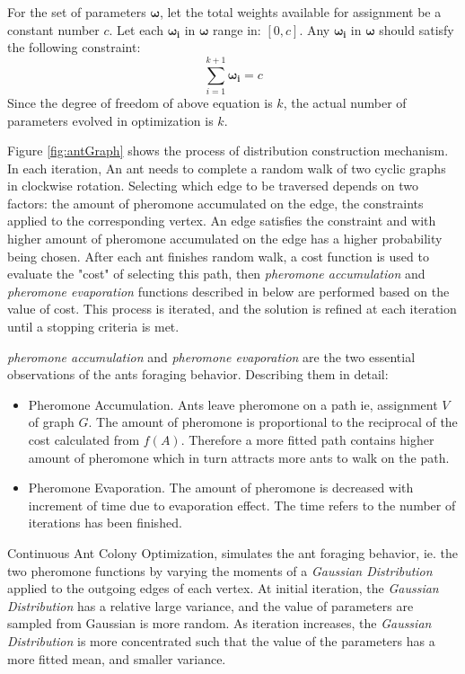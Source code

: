 \documentclass[journal]{IEEEtran}
\renewcommand{\vec}[1]{\mathbf{#1}}
\begin{document}
For the set of parameters \(\vec{\omega}\), let the total weights available for assignment be a constant number \(c\). Let each \(\vec{\omega_{i}}\) in \(\vec{\omega}\) range in: \([0,c]\). Any \(\vec{\omega_{i}}\) in \(\vec{\omega}\) should satisfy the following constraint:
\[\sum_{i=1}^{k+1}\vec{\omega_{i}} = c\]
Since the degree of freedom of above equation is \(k\), the actual number of parameters evolved in optimization is \(k\).

Figure \ref{fig:antGraph} shows the process of distribution construction mechanism. In each iteration, An ant needs to complete a random walk of two cyclic graphs in clockwise rotation. Selecting which edge to be traversed depends on two factors: the amount of pheromone accumulated on the edge, the constraints applied to the corresponding vertex. An edge satisfies the constraint and with higher amount of pheromone accumulated on the edge has a higher probability being chosen. After each ant finishes random walk, a cost function is used to evaluate the "cost" of selecting this path, then \emph{pheromone accumulation} and \emph{pheromone evaporation} functions described in below are performed based on the value of cost. This process is iterated, and the solution is refined at each iteration until a stopping criteria is met.

\emph{pheromone accumulation} and \emph{pheromone evaporation} are the two essential observations of the ants foraging behavior. Describing them in detail:
\begin{itemize}
	\item Pheromone Accumulation. Ants leave pheromone on a path ie, assignment \(V\) of graph \(G\). The amount of pheromone is proportional to the reciprocal of the cost calculated from \(f(A)\). Therefore a more fitted path contains higher amount of pheromone which in turn attracts more ants to walk on the path.
	\item Pheromone Evaporation. The amount of pheromone is decreased with increment of time due to evaporation effect. The time refers to the number of iterations has been finished.
\end{itemize}

Continuous Ant Colony Optimization, simulates the ant foraging behavior, ie. the two pheromone functions by varying the moments of a \emph{Gaussian Distribution} applied to the outgoing edges of each vertex. At initial iteration, the \emph{Gaussian Distribution} has a relative large variance, and the value of parameters are sampled from Gaussian is more random. As iteration increases, the \emph{Gaussian Distribution} is more concentrated such that the value of the parameters has a more fitted mean, and smaller variance.
\end{document}
